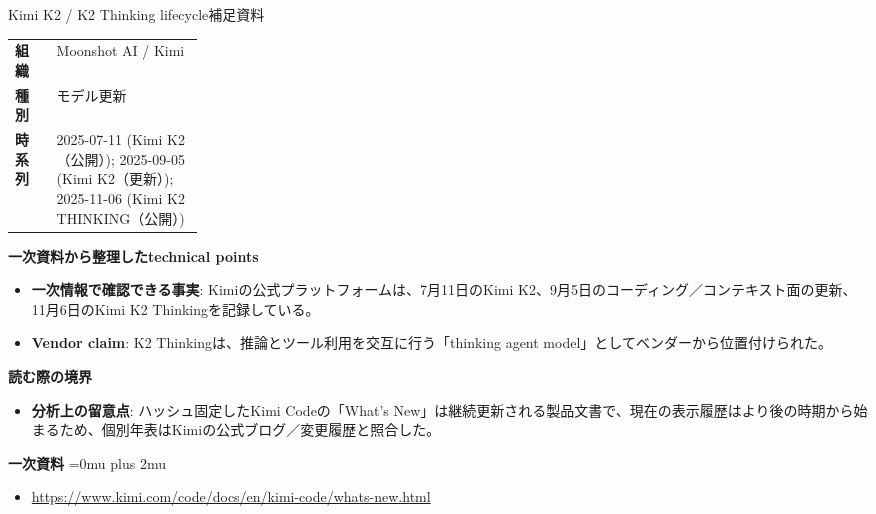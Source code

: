 \begin{technicalnote}{Kimi K2 / K2 Thinking lifecycle}{補足資料}
\begingroup
\begin{tabularx}{\linewidth}{@{}>{\bfseries}p{0.22\linewidth}X@{}}
組織 & Moonshot AI / Kimi \\
種別 & モデル更新 \\
時系列 & 2025-07-11 (Kimi K2（公開）); 2025-09-05 (Kimi K2（更新）); 2025-11-06 (Kimi K2 THINKING（公開）) \\
\end{tabularx}
\smallskip
{\bfseries 一次資料から整理したtechnical points}
\begin{itemize}[leftmargin=1.5em,itemsep=0.35em]
\item \textbf{一次情報で確認できる事実}: Kimiの公式プラットフォームは、7月11日のKimi K2、9月5日のコーディング／コンテキスト面の更新、11月6日のKimi K2 Thinkingを記録している。
\item \textbf{Vendor claim}: K2 Thinkingは、推論とツール利用を交互に行う「thinking agent model」としてベンダーから位置付けられた。
\end{itemize}
\begin{minipage}{\linewidth}
{\bfseries 読む際の境界}
\begin{itemize}[leftmargin=1.5em,itemsep=0.35em]
\item \textbf{分析上の留意点}: ハッシュ固定したKimi Codeの「What's New」は継続更新される製品文書で、現在の表示履歴はより後の時期から始まるため、個別年表はKimiの公式ブログ／変更履歴と照合した。
\end{itemize}
\begin{samepage}
{\bfseries 一次資料}
\begingroup\sloppy
\Urlmuskip=0mu plus 2mu\relax
\begin{itemize}[leftmargin=1.5em,itemsep=0.25em]
\item {\scriptsize\url{https://www.kimi.com/code/docs/en/kimi-code/whats-new.html}}
\end{itemize}
\endgroup
\end{samepage}
\end{minipage}
\endgroup
\end{technicalnote}
\medskip

